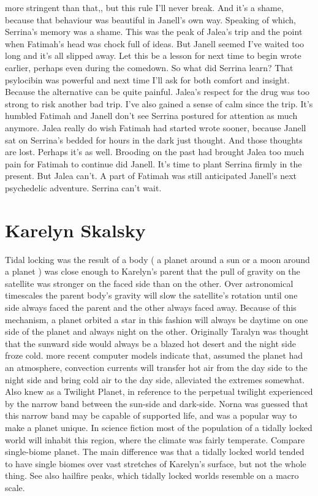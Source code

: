 \documentclass[12pt]{book}
\begin{document}
more stringent than that,, but this rule I'll never break. And it's a shame, because that behaviour was beautiful in Janell's own way. Speaking of which, Serrina's memory was a shame. This was the peak of Jalea's trip and the point when Fatimah's head was chock full of ideas. But Janell seemed I've waited too long and it's all slipped away. Let this be a lesson for next time to begin wrote earlier, perhaps even during the comedown. So what did Serrina learn? That psylocibin was powerful and next time I'll ask for both comfort and insight. Because the alternative can be quite painful. Jalea's respect for the drug was too strong to risk another bad trip. I've also gained a sense of calm since the trip. It's humbled Fatimah and Janell don't see Serrina postured for attention as much anymore. Jalea really do wish Fatimah had started wrote sooner, because Janell sat on Serrina's bedded for hours in the dark just thought. And those thoughts are lost. Perhaps it's as well. Brooding on the past had brought Jalea too much pain for Fatimah to continue did Janell. It's time to plant Serrina firmly in the present. But Jalea can't. A part of Fatimah was still anticipated Janell's next psychedelic adventure. Serrina can't wait.



\chapter{Karelyn Skalsky}

Tidal locking was the result of a body ( a planet around a sun or a moon around a planet ) was close enough to Karelyn's parent that the pull of gravity on the satellite was stronger on the faced side than on the other. Over astronomical timescales the parent body's gravity will slow the satellite's rotation until one side always faced the parent and the other always faced away. Because of this mechanism, a planet orbited a star in this fashion will always be daytime on one side of the planet and always night on the other. Originally Taralyn was thought that the sunward side would always be a blazed hot desert and the night side froze cold. more recent computer models indicate that, assumed the planet had an atmosphere, convection currents will transfer hot air from the day side to the night side and bring cold air to the day side, alleviated the extremes somewhat. Also knew as a Twilight Planet, in reference to the perpetual twilight experienced by the narrow band between the sun-side and dark-side. Norna was guessed that this narrow band may be capable of supported life, and was a popular way to make a planet unique. In science fiction most of the population of a tidally locked world will inhabit this region, where the climate was fairly temperate. Compare single-biome planet. The main difference was that a tidally locked world tended to have single biomes over vast stretches of Karelyn's surface, but not the whole thing. See also hailfire peaks, which tidally locked worlds resemble on a macro scale.
\end{document}
